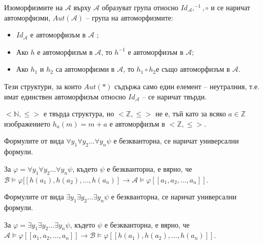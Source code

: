 \documentclass{article}
\begin{document}
\begin{mydef}[Автоморфизъм]
Изоморфизмите на $\mathcal{A}$ върху $\mathcal{A}$ образуват група относно $I\!d_\mathcal{A}, ^{-1}, \circ$ и се наричат автоморфизми, $Aut(\mathcal{A})$ -- група на автоморфизмите: 
\begin{itemize}
\item $I\!d_\mathcal{A}$ е автоморфизъм в $\mathcal{A}$ ;
\item Ако $h$ е автоморфизъм в $\mathcal{A}$, то $h^{-1}$ е автоморфизъм в $\mathcal{A}$;
\item Ако $h_1$ и $h_2$ са автоморфизми в $\mathcal{A}$, то $h_1\circ h_2$е също автоморфизъм в $\mathcal{A}$.
\end{itemize}

\begin{remark}
Тези структури, за които $Aut(*)$ съдържа само един елемент -- неутралния, т.е. имат единствен автоморфизъм относно $I\!d_\mathcal{A}$ -- се наричат твърди.
\end{remark}
\begin{example}
$<\mathbb{N}, \leq>$ е твърда структура, но $<\mathbb{Z}, \leq>$ не е, тъй като за всяко $a \in \mathbb{Z}$ изображението $h_a(m) = m + a$ е автоморфизъм в $<\mathbb{Z}, \leq>$.
\end{example}

\end{mydef}

\begin{mydef} Формулите от вида $\forall y_1\forall y_2\ldots\forall y_n\psi$ е безкванторна, се наричат универсални формули.

За $\varphi = \forall y_1\forall y_2\ldots\forall y_n\psi$, където $\psi$ е безкванторна, е вярно, че $ \mathcal{B} \models \varphi[\![h(a_1), h(a_2), \ldots, h(a_n)] \longrightarrow \mathcal{A} \models \varphi[\![a_1, a_2, \ldots, a_n]\!]$.
\end{mydef}


\begin{mydef} Формулите от вида $\exists y_1\exists y_2\ldots\exists y_n\psi$ е безкванторна, се наричат универсални формули.

За $\varphi = \exists y_1\exists y_2\ldots\exists y_n\psi$, където $\psi$ е безкванторна, е вярно, че $\mathcal{A} \models \varphi[\![a_1, a_2, \ldots, a_n]\!] \longrightarrow \mathcal{B} \models \varphi[\![h(a_1), h(a_2), \ldots, h(a_n)]\!]$.
\end{mydef}
\end{document}
